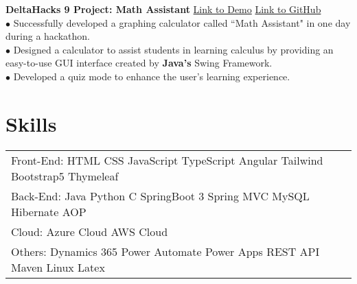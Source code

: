 \documentclass[letterpaper,12pt]{article}
\begin{document}
\textbf{DeltaHacks 9 Project: Math Assistant} \hfill \href{https://devpost.com/software/math-helper-graphing-calculator}{Link to Demo} \hspace{0.2cm} \href{https://github.com/Zicheng-Li/Math_helper}{Link to GitHub} \\
\hspace{0.1cm} $\bullet$ Successfully developed a graphing calculator called ``Math Assistant" in one day during a hackathon. \\
\hspace{0.1cm} $\bullet$ Designed a calculator to assist students in learning calculus by providing an easy-to-use GUI interface created by \textbf{Java's} Swing Framework.\\ 
\hspace{0.1cm} $\bullet$ Developed a quiz mode to enhance the user's learning experience.

\section{Skills}
\begin{tabularx}{\linewidth}{@{}l X@{}}
Front-End: \hspace{0.05cm} HTML \hspace{0.05cm} CSS \hspace{0.55cm} JavaScript \hspace{0.2cm} TypeScript \hspace{0.2cm} Angular \hspace{0.2cm} Tailwind \hspace{0.2cm} Bootstrap5 \hspace{0.2cm} Thymeleaf \\
Back-End: \hspace{0.05cm} Java \hspace{0.37cm} Python \hspace{0.1cm} C \hspace{0.1cm} SpringBoot 3 \hspace{0.05cm} Spring MVC  \hspace{0.1cm} MySQL \hspace{0.1cm} Hibernate \hspace{0.1cm} AOP \\
Cloud:  \hspace{0.75cm} Azure Cloud \hspace{0.55cm} AWS Cloud  \\
Others: \hspace{0.57cm} Dynamics 365 \hspace{0.2cm} Power Automate \hspace{0.1cm} Power Apps \hspace{0.1cm} REST API \hspace{0.1cm} Maven \hspace{0.1cm} Linux \hspace{0.1cm} Latex \\
\end{tabularx}
\end{document}
